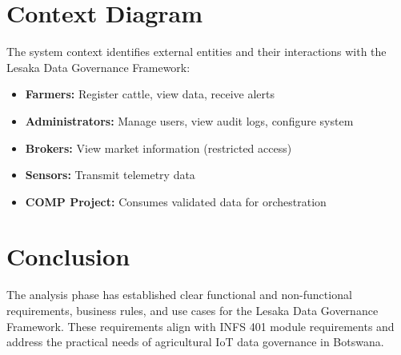 \section{Context Diagram}

The system context identifies external entities and their interactions with the Lesaka Data Governance Framework:

\begin{itemize}
    \item \textbf{Farmers:} Register cattle, view data, receive alerts
    \item \textbf{Administrators:} Manage users, view audit logs, configure system
    \item \textbf{Brokers:} View market information (restricted access)
    \item \textbf{Sensors:} Transmit telemetry data
    \item \textbf{COMP Project:} Consumes validated data for orchestration
\end{itemize}

\section{Conclusion}

The analysis phase has established clear functional and non-functional requirements, business rules, and use cases for the Lesaka Data Governance Framework. These requirements align with INFS 401 module requirements and address the practical needs of agricultural IoT data governance in Botswana.
